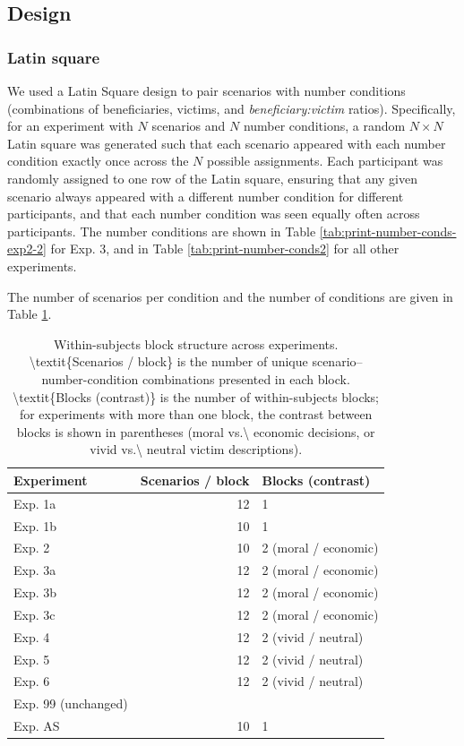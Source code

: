 \documentclass[
]{article}
\begin{document}
\subsection{Design}\label{app:design}

\subsubsection{Latin square}\label{latin-square}

We used a Latin Square design to pair scenarios with number conditions (combinations of beneficiaries, victims, and \emph{beneficiary:victim} ratios). Specifically, for an experiment with \(N\) scenarios and \(N\) number conditions, a random \(N \times N\) Latin square was generated such that each scenario appeared with each number condition exactly once across the \(N\) possible assignments. Each participant was randomly assigned to one row of the Latin square, ensuring that any given scenario always appeared with a different number condition for different participants, and that each number condition was seen equally often across participants. The number conditions are shown in Table \ref{tab:print-number-conds-exp2-2} for Exp. 3, and in Table \ref{tab:print-number-conds2} for all other experiments.

The number of scenarios per condition and the number of conditions are given in Table \ref{tab:print-trials-per-exp}.

\begin{table}
\centering
\caption{\label{tab:print-trials-per-exp}Within-subjects block structure across experiments. \textbackslash{}textit\{Scenarios / block\} is the number of unique scenario--number-condition combinations presented in each block. \textbackslash{}textit\{Blocks (contrast)\} is the number of within-subjects blocks; for experiments with more than one block, the contrast between blocks is shown in parentheses (moral vs.\textbackslash{} economic decisions, or vivid vs.\textbackslash{} neutral victim descriptions).}
\centering
\begin{tabular}[t]{lrl}
\toprule
Experiment & Scenarios / block & Blocks (contrast)\\
\midrule
Exp. 1a & 12 & 1\\
Exp. 1b & 10 & 1\\
Exp. 2 & 10 & 2 (moral / economic)\\
Exp. 3a & 12 & 2 (moral / economic)\\
Exp. 3b & 12 & 2 (moral / economic)\\
\addlinespace
Exp. 3c & 12 & 2 (moral / economic)\\
Exp. 4 & 12 & 2 (vivid / neutral)\\
Exp. 5 & 12 & 2 (vivid / neutral)\\
Exp. 6 & 12 & 2 (vivid / neutral)\\
Exp. 99 (unchanged) &  & \\
\addlinespace
Exp. AS & 10 & 1\\
\bottomrule
\end{tabular}
\end{table}
\end{document}
